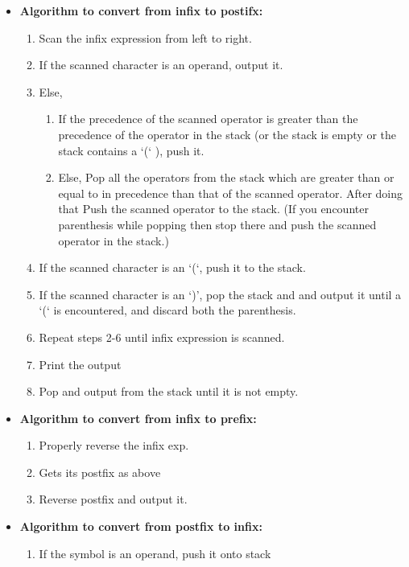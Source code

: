 \documentclass[8pt, a4paper, oneside, twocolumn]{extarticle}
\begin{document}
\begin{itemize}
\begin{verbatim}
    \end{verbatim}
    \item \textbf{Algorithm to convert from infix to postifx: }
        \begin{enumerate}
        \item Scan the infix expression from left to right.
        \item If the scanned character is an operand, output it.
        \item Else,
            \begin{enumerate}
            \item If the precedence of the scanned operator is greater than the precedence of the operator in the stack (or the stack is empty or the stack contains a ‘(‘ ), push it.
            \item  Else, Pop all the operators from the stack which are greater than or equal to in precedence than that of the scanned operator. After doing that Push the scanned operator to the stack. (If you encounter parenthesis while popping then stop there and push the scanned operator in the stack.)
            \end{enumerate}
        \item If the scanned character is an ‘(‘, push it to the stack.
        \item If the scanned character is an ‘)’, pop the stack and and output it until a ‘(‘ is encountered, and discard both the parenthesis.
        \item Repeat steps 2-6 until infix expression is scanned.
        \item Print the output
        \item Pop and output from the stack until it is not empty.
        \end{enumerate}
    \item \textbf{Algorithm to convert from infix to prefix: }
        \begin{enumerate}
        \item Properly reverse the infix exp.
        \item Gets its postfix as above
        \item Reverse postfix and output it.
        \end{enumerate}
    \item \textbf{Algorithm to convert from postfix to infix: }
        \begin{enumerate}
        \item If the symbol is an operand, push it onto stack

\end{enumerate}
\end{itemize}
\end{document}
